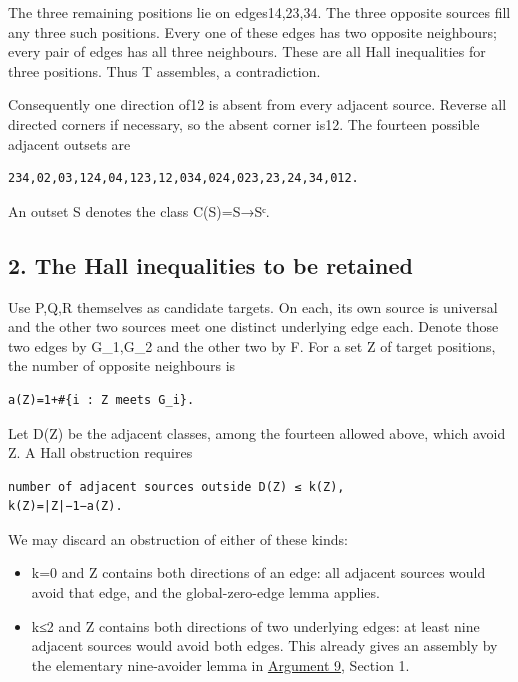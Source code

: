 \documentclass[
  10pt,
]{article}
\providecommand{\tightlist}{%
  \setlength{\itemsep}{0pt}\setlength{\parskip}{0pt}}
\begin{document}
The three remaining positions lie on edges14,23,34. The three opposite
sources fill any three such positions. Every one of these edges has two
opposite neighbours; every pair of edges has all three neighbours. These
are all Hall inequalities for three positions. Thus T assembles, a
contradiction.

Consequently one direction of12 is absent from every adjacent source.
Reverse all directed corners if necessary, so the absent corner is12.
The fourteen possible adjacent outsets are

\begin{verbatim}
234,02,03,124,04,123,12,034,024,023,23,24,34,012.
\end{verbatim}

An outset S denotes the class C(S)=S→Sᶜ.

\hypertarget{the-hall-inequalities-to-be-retained}{%
\subsection*{2. The Hall inequalities to be
retained}\label{the-hall-inequalities-to-be-retained}}

Use P,Q,R themselves as candidate targets. On each, its own source is
universal and the other two sources meet one distinct underlying edge
each. Denote those two edges by G\_1,G\_2 and the other two by F. For a
set Z of target positions, the number of opposite neighbours is

\begin{verbatim}
a(Z)=1+#{i : Z meets G_i}.
\end{verbatim}

Let D(Z) be the adjacent classes, among the fourteen allowed above,
which avoid Z. A Hall obstruction requires

\begin{verbatim}
number of adjacent sources outside D(Z) ≤ k(Z),
k(Z)=|Z|−1−a(Z).
\end{verbatim}

We may discard an obstruction of either of these kinds:

\begin{itemize}
\tightlist
\item
  k=0 and Z contains both directions of an edge: all adjacent sources
  would avoid that edge, and the global-zero-edge lemma applies.
\item
  k≤2 and Z contains both directions of two underlying edges: at least
  nine adjacent sources would avoid both edges. This already gives an
  assembly by the elementary nine-avoider lemma in
  \protect\hyperlink{arg-9}{Argument 9}, Section 1.
\end{itemize}
\end{document}
